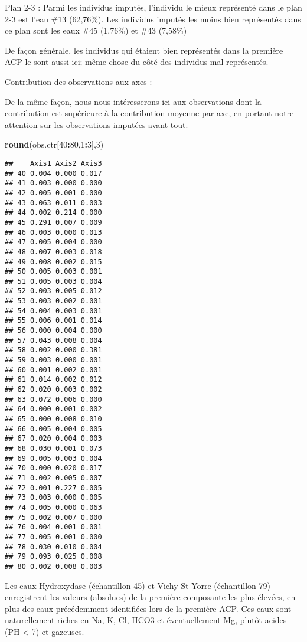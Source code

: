 \documentclass[]{article}
\newenvironment{Shaded}{\begin{snugshade}}{\end{snugshade}}
\newcommand{\KeywordTok}[1]{\textcolor[rgb]{0.13,0.29,0.53}{\textbf{#1}}}
\newcommand{\DecValTok}[1]{\textcolor[rgb]{0.00,0.00,0.81}{#1}}
\newcommand{\OperatorTok}[1]{\textcolor[rgb]{0.81,0.36,0.00}{\textbf{#1}}}
\newcommand{\NormalTok}[1]{#1}
\begin{document}
Plan 2-3 : Parmi les individus imputés, l'individu le mieux représenté
dans le plan 2-3 est l'eau \#13 (62,76\%). Les individus imputés les
moins bien représentés dans ce plan sont les eaux \#45 (1,76\%) et \#43
(7,58\%)

De façon générale, les individus qui étaient bien représentés dans la
première ACP le sont aussi ici; même chose du côté des individus mal
représentés.

Contribution des observations aux axes :

De la même façon, nous nous intéresserons ici aux observations dont la
contribution est supérieure à la contribution moyenne par axe, en
portant notre attention sur les observations imputées avant tout.

\begin{Shaded}
\begin{Highlighting}[]
\KeywordTok{round}\NormalTok{(obs.ctr[}\DecValTok{40}\OperatorTok{:}\DecValTok{80}\NormalTok{,}\DecValTok{1}\OperatorTok{:}\DecValTok{3}\NormalTok{],}\DecValTok{3}\NormalTok{)}
\end{Highlighting}
\end{Shaded}

\begin{verbatim}
##    Axis1 Axis2 Axis3
## 40 0.004 0.000 0.017
## 41 0.003 0.000 0.000
## 42 0.005 0.001 0.000
## 43 0.063 0.011 0.003
## 44 0.002 0.214 0.000
## 45 0.291 0.007 0.009
## 46 0.003 0.000 0.013
## 47 0.005 0.004 0.000
## 48 0.007 0.003 0.018
## 49 0.008 0.002 0.015
## 50 0.005 0.003 0.001
## 51 0.005 0.003 0.004
## 52 0.003 0.005 0.012
## 53 0.003 0.002 0.001
## 54 0.004 0.003 0.001
## 55 0.006 0.001 0.014
## 56 0.000 0.004 0.000
## 57 0.043 0.008 0.004
## 58 0.002 0.000 0.381
## 59 0.003 0.000 0.001
## 60 0.001 0.002 0.001
## 61 0.014 0.002 0.012
## 62 0.020 0.003 0.002
## 63 0.072 0.006 0.000
## 64 0.000 0.001 0.002
## 65 0.000 0.008 0.010
## 66 0.005 0.004 0.005
## 67 0.020 0.004 0.003
## 68 0.030 0.001 0.073
## 69 0.005 0.003 0.004
## 70 0.000 0.020 0.017
## 71 0.002 0.005 0.007
## 72 0.001 0.227 0.005
## 73 0.003 0.000 0.005
## 74 0.005 0.000 0.063
## 75 0.002 0.007 0.000
## 76 0.004 0.001 0.001
## 77 0.005 0.001 0.000
## 78 0.030 0.010 0.004
## 79 0.093 0.025 0.008
## 80 0.002 0.008 0.003
\end{verbatim}

Les eaux Hydroxydase (échantillon 45) et Vichy St Yorre (échantillon 79)
enregistrent les valeurs (absolues) de la première composante les plus
élevées, en plus des eaux précédemment identifiées lors de la première
ACP. Ces eaux sont naturellement riches en Na, K, Cl, HCO3 et
éventuellement Mg, plutôt acides (PH \textless{} 7) et gazeuses.
\end{document}
